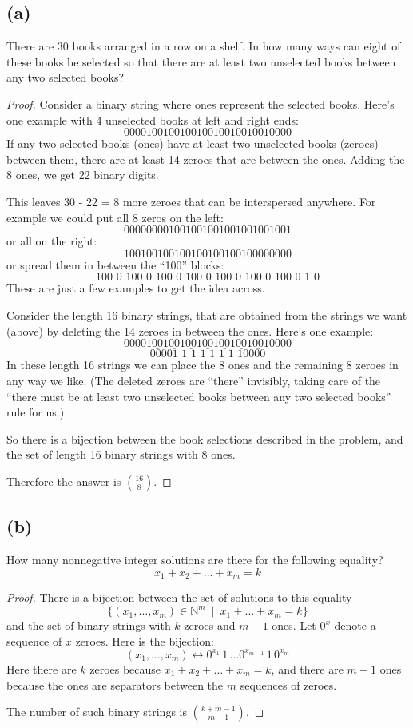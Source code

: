 \documentclass[14pt]{extarticle}
\newcommand{\dps}{\displaystyle}
\begin{document}
\subsection{(a)}
There are 30 books arranged in a row on a shelf. In how many ways can eight of these books be selected so that there are at least two unselected books between any two selected books?
\begin{proof}
Consider a binary string where ones represent the selected books. Here's one example with 4 unselected books at left and right ends:
$$
000010010010010010010010010000
$$
If any two selected books (ones) have at least two unselected books (zeroes) between them, there are at least 14 zeroes that are between the ones. Adding the 8 ones, we get 22 binary digits. 

This leaves 30 - 22 = 8 more zeroes that can be interspersed anywhere. For example we could put all 8 zeros on the left:
$$
000000001001001001001001001001
$$
or all on the right:
$$
100100100100100100100100000000
$$
or spread them in between the ``100'' blocks:
$$
100\,\,0\,\,100\,\,0\,\,100\,\,0\,\,100\,\,0\,\,100\,\,0\,\,100\,\,0\,\,100\,\,0\,\,1\,\,0
$$
These are just a few examples to get the idea across.

Consider the length 16 binary strings, that are obtained from the strings we want (above) by deleting the 14 zeroes in between the ones. Here's one example:
$$
00001\underline{00}1\underline{00}1\underline{00}1\underline{00}1\underline{00}1\underline{00}1\underline{00}10000
$$
$$
00001\,\,1\,\,1\,\,1\,\,1\,\,1\,\,1\,\,10000
$$
In these length 16 strings we can place the 8 ones and the remaining 8 zeroes in any way we like. (The deleted zeroes are ``there'' invisibly, taking care of the ``there must be at least two unselected books between any two selected books'' rule for us.)

So there is a bijection between the book selections described in the problem, and the set of length 16 binary strings with 8 ones.

Therefore the answer is $\dps\binom{16}{8}$.
\end{proof}

\subsection{(b)}
How many nonnegative integer solutions are there for the following equality?
$$
x_1 + x_2 + \ldots + x_m = k
$$
\begin{proof}
There is a bijection between the set of solutions to this equality
$$
\{(x_1, \ldots, x_m) \in \mathbb{N}^m \,\,\,|\,\,\,x_1 + \ldots + x_m = k\}
$$ 
and the set of binary strings with $k$ zeroes and $m-1$ ones. Let $0^x$ denote a sequence of $x$ zeroes. Here is the bijection:
$$
(x_1, \ldots, x_m) \longleftrightarrow 0^{x_1} \,1\, \ldots 0^{x_{m-1}} \,1\, 0^{x_m}
$$
Here there are $k$ zeroes because $x_1 + x_2 + \ldots + x_m = k$, and there are $m-1$ ones because the ones are separators between the $m$ sequences of zeroes.

The number of such binary strings is $\dps\binom{k+m-1}{m-1}$.
\end{proof}
\end{document}
